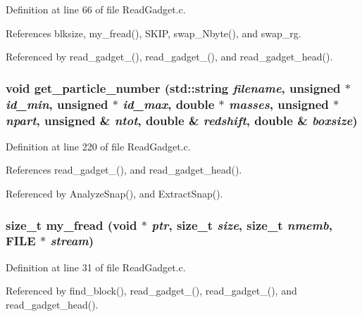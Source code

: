 Definition at line 66 of file ReadGadget.c.



References blksize, my\_\-fread(), SKIP, swap\_\-Nbyte(), and swap\_\-rg.



Referenced by read\_\-gadget\_(), read\_\-gadget\_(), and read\_\-gadget\_\-head().

\subsubsection[{get\_\-particle\_\-number}]{\setlength{\rightskip}{0pt plus 5cm}void get\_\-particle\_\-number (std::string {\em filename}, \/  unsigned $\ast$ {\em id\_\-min}, \/  unsigned $\ast$ {\em id\_\-max}, \/  double $\ast$ {\em masses}, \/  unsigned $\ast$ {\em npart}, \/  unsigned \& {\em ntot}, \/  double \& {\em redshift}, \/  double \& {\em boxsize})}\label{ReadGadget_8c_a275b45dee34efc2ef2f3bb402ca17993}


Definition at line 220 of file ReadGadget.c.



References read\_\-gadget\_(), and read\_\-gadget\_\-head().



Referenced by AnalyzeSnap(), and ExtractSnap().

\subsubsection[{my\_\-fread}]{\setlength{\rightskip}{0pt plus 5cm}size\_\-t my\_\-fread (void $\ast$ {\em ptr}, \/  size\_\-t {\em size}, \/  size\_\-t {\em nmemb}, \/  FILE $\ast$ {\em stream})}\label{ReadGadget_8c_a1609620c03f6b0068601735c42e3c660}


Definition at line 31 of file ReadGadget.c.



Referenced by find\_\-block(), read\_\-gadget\_(), read\_\-gadget\_(), and read\_\-gadget\_\-head().

